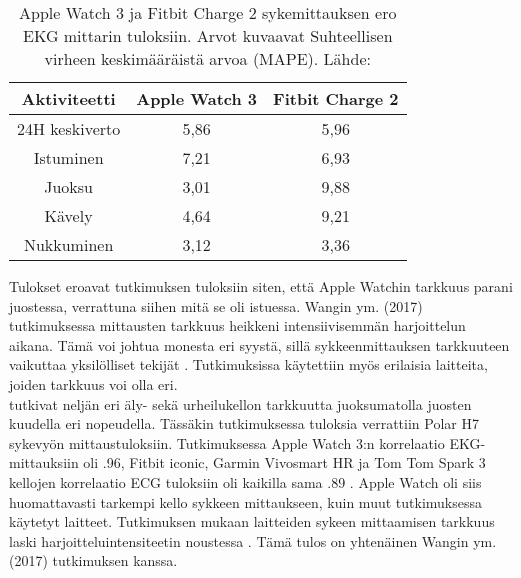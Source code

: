\documentclass[utf8,bachelor,finnish]{bachelor}
\begin{document}
    \begin{table}[H]
     \begin{center}
      \begin{tabular}{||c c c||}   
       \hline
       Aktiviteetti & Apple Watch 3 & Fitbit Charge 2\\ [0.5ex] 
       \hline\hline
       24H keskiverto & 5,86 & 5,96\\ 
       \hline
       Istuminen & 7,21 & 6,93\\ 
       \hline
       Juoksu & 3,01 & 9,88 \\
       \hline
       Kävely & 4,64 & 9,21\\
       \hline
       Nukkuminen & 3,12 & 3,36\\[1ex] 
       \hline
      \end{tabular}
    \caption{Apple Watch 3 ja Fitbit Charge 2 sykemittauksen ero EKG mittarin tuloksiin. Arvot kuvaavat Suhteellisen virheen keskimääräistä arvoa (MAPE). Lähde: \textcite{nelson_accuracy_2019}}
     \end{center} 
    \end{table}

  Tulokset eroavat \textcite{wang_accuracy_2017} tutkimuksen tuloksiin siten, että Apple Watchin tarkkuus parani juostessa, verrattuna siihen mitä se oli istuessa. Wangin ym. (2017) tutkimuksessa
   mittausten tarkkuus heikkeni intensiivisemmän harjoittelun aikana. Tämä voi johtua monesta eri syystä, sillä sykkeenmittauksen tarkkuuteen vaikuttaa yksilölliset tekijät \parencite{koerber_accuracy_2022,pasadyn_accuracy_2019,hochstadt_continuous_2020}.
    Tutkimuksissa käytettiin myös erilaisia laitteita, joiden tarkkuus voi olla eri. \\

  \textcite{pasadyn_accuracy_2019} tutkivat neljän eri äly- sekä urheilukellon tarkkuutta juoksumatolla juosten kuudella eri nopeudella. Tässäkin tutkimuksessa tuloksia verrattiin
   Polar H7 sykevyön mittaustuloksiin. Tutkimuksessa Apple Watch 3:n korrelaatio EKG-mittauksiin oli .96, Fitbit iconic, Garmin Vivosmart HR ja Tom Tom Spark 3
    kellojen korrelaatio ECG tuloksiin oli kaikilla sama .89 \parencite{pasadyn_accuracy_2019}. Apple Watch oli siis huomattavasti tarkempi kello sykkeen mittaukseen,
     kuin muut tutkimuksessa käytetyt laitteet. Tutkimuksen mukaan laitteiden sykeen mittaamisen tarkkuus laski
      harjoitteluintensiteetin noustessa \parencite{pasadyn_accuracy_2019}. Tämä tulos on yhtenäinen Wangin ym. (2017) tutkimuksen kanssa.\\
  
\end{document}
